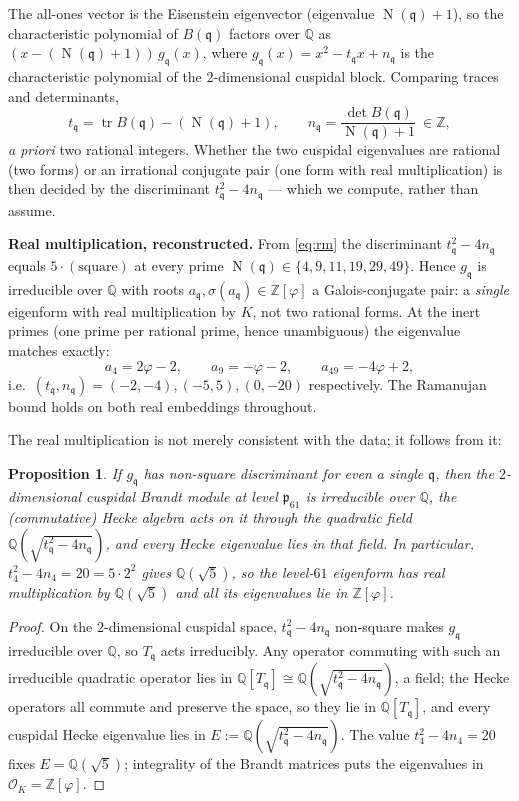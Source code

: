 \documentclass[11pt,a4paper]{article}
\newtheorem{proposition}[theorem]{Proposition}
\newcommand{\Q}{\mathbb{Q}}
\newcommand{\Z}{\mathbb{Z}}
\newcommand{\Ord}{\mathcal{O}}
\newcommand{\fp}{\mathfrak{p}}
\newcommand{\fq}{\mathfrak{q}}
\newcommand{\Brandt}{B}
\newcommand{\OK}{\Ord_K}
\DeclareMathOperator{\Nm}{N}
\begin{document}
The all-ones vector is the Eisenstein eigenvector (eigenvalue
$\Nm(\fq)+1$), so the characteristic polynomial of $\Brandt(\fq)$
factors over $\Q$ as $(x-(\Nm(\fq)+1))\,g_\fq(x)$, where $g_\fq(x)=
x^2-t_\fq x+n_\fq$ is the characteristic polynomial of the $2$-dimensional
cuspidal block. Comparing traces and determinants,
\begin{equation}
  t_\fq=\operatorname{tr}\Brandt(\fq)-(\Nm(\fq)+1),
  \qquad
  n_\fq=\frac{\det\Brandt(\fq)}{\Nm(\fq)+1}\ \in\Z,
  \label{eq:rm}
\end{equation}
\emph{a priori} two rational integers. Whether the two cuspidal
eigenvalues are rational (two forms) or an irrational conjugate pair
(one form with real multiplication) is then decided by the
discriminant $t_\fq^2-4n_\fq$ --- which we compute, rather than assume.

\begin{verifiedbox}
\textbf{Real multiplication, reconstructed.} From \eqref{eq:rm} the
discriminant $t_\fq^2-4n_\fq$ equals $5\cdot(\text{square})$ at every
prime $\Nm(\fq)\in\{4,9,11,19,29,49\}$. Hence $g_\fq$ is irreducible
over $\Q$ with roots $a_\fq,\sigma(a_\fq)\in\Z[\varphi]$ a Galois-conjugate
pair: a \emph{single} eigenform with real multiplication by $K$, not two
rational forms. At the inert primes (one prime per rational prime, hence
unambiguous) the eigenvalue matches \cite{Dembele2005} exactly:
\[
  a_4=2\varphi-2,\qquad a_9=-\varphi-2,\qquad a_{49}=-4\varphi+2,
\]
i.e.\ $(t_\fq,n_\fq)=(-2,-4),(-5,5),(0,-20)$ respectively. The
Ramanujan bound holds on both real embeddings throughout.
\end{verifiedbox}

The real multiplication is not merely consistent with the data; it
follows from it:

\begin{proposition}\label{prop:rm}
If $g_\fq$ has non-square discriminant for even a single $\fq$, then the
$2$-dimensional cuspidal Brandt module at level $\fp_{61}$ is irreducible
over $\Q$, the (commutative) Hecke algebra acts on it through the
quadratic field $\Q(\sqrt{t_\fq^2-4n_\fq})$, and every Hecke eigenvalue
lies in that field. In particular, $t_4^2-4n_4=20=5\cdot2^2$ gives
$\Q(\sqrt5)$, so the level-$61$ eigenform has real multiplication by
$\Q(\sqrt5)$ and all its eigenvalues lie in $\Z[\varphi]$.
\end{proposition}
\begin{proof}
On the $2$-dimensional cuspidal space, $t_\fq^2-4n_\fq$ non-square makes
$g_\fq$ irreducible over $\Q$, so $T_\fq$ acts irreducibly. Any operator
commuting with such an irreducible quadratic operator lies in
$\Q[T_\fq]\cong\Q(\sqrt{t_\fq^2-4n_\fq})$, a field; the Hecke operators
all commute and preserve the space, so they lie in $\Q[T_\fq]$, and every
cuspidal Hecke eigenvalue lies in $E:=\Q(\sqrt{t_\fq^2-4n_\fq})$. The
value $t_4^2-4n_4=20$ fixes $E=\Q(\sqrt5)$; integrality of the Brandt
matrices puts the eigenvalues in $\OK=\Z[\varphi]$.
\end{proof}
\end{document}
